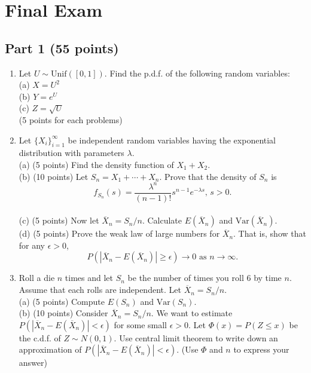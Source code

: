 \documentclass[14pt]{extarticle}
\begin{document}
\section*{Final Exam}
\subsection*{Part 1 (55 points)}
\begin{enumerate}
    \item Let $U\sim\text{Unif}([0,1])$. Find the p.d.f. of the following random variables:\\
    (a) $X=U^2$\\
    (b) $Y=e^U$\\
    (c) $Z=\sqrt{U}$\\
    (5 points for each problems)
    
    \item Let $\{X_i\}_{i=1}^\infty$ be independent random variables having the exponential distribution with parameters $\lambda$.\\
    (a) (5 points) Find the density function of $X_1+X_2$.\\
    (b) (10 points) Let $S_n=X_1+\cdots+X_n$. Prove that the density of $S_n$ is
    \begin{equation*}
    f_{S_n}(s)=\frac{\lambda^n}{(n-1)!}s^{n-1}e^{-\lambda s},\,s>0.
    \end{equation*}\\
    (c) (5 points) Now let $\overline{X}_n=S_n/n$. Calculate $E(\overline{X}_n)$ and $\text{Var}(\overline{X}_n)$.\\
    (d) (5 points) Prove the weak law of large numbers for $\overline{X}_n$. That is, show that for any $\epsilon>0$,
    \begin{equation*}    
    P(|\overline{X}_n-E(\overline{X}_n)|\geq\epsilon)\rightarrow 0\text{ as }n\rightarrow\infty.
    \end{equation*}
    
    \item Roll a die $n$ times and let $S_n$ be the number of times you roll $6$ by time $n$. Assume that each rolls are independent. Let $\overline{X}_n=S_n/n$.\\
    (a) (5 points) Compute $E(S_n)$ and $\text{Var}(S_n)$.\\
    (b) (10 points) Consider $\overline{X}_n=S_n/n$. We want to estimate $P(|\overline{X}_n-E(\overline{X}_n)|<\epsilon)$ for some small $\epsilon>0$. Let $\Phi(x)=P(Z\leq x)$ be the c.d.f. of $Z\sim N(0,1)$. Use central limit theorem to write down an approximation of $P(|\overline{X}_n-E(\overline{X}_n)|<\epsilon)$. (Use $\Phi$ and $n$ to express your answer)
    
\end{enumerate}
\end{document}

